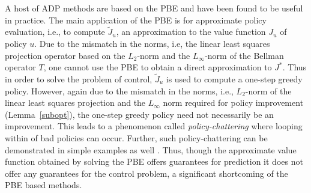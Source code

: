 A host of ADP methods are based on the PBE and have been found to be useful in practice. The main application of the PBE is for approximate policy evaluation, i.e., to compute $\tilde{J}_u$, an approximation to the value function $J_u$ of policy $u$. Due to the mismatch in the norms, i.e, the linear least squares projection operator based on the $L_2$-norm and the $L_\infty$-norm of the Bellman operator $T$, one cannot use the PBE to obtain a direct approximation to $J^*$. Thus in order to solve the problem of control, $\tilde{J}_u$ is used to compute a one-step greedy policy. However, again due to the mismatch in the norms, i.e., $L_2$-norm of the linear least squares projection and the $L_\infty$ norm required for policy improvement (Lemma~\ref{subopt}), the one-step greedy policy need not necessarily be an improvement. This leads to a phenomenon called \emph{policy-chattering} \cite{dpchapter} where looping within of bad policies can occur. Further, such policy-chattering can be demonstrated in simple examples as well \cite{dpchapter}. Thus, though the approximate value function obtained by solving the PBE offers guarantees for prediction it does not offer any guarantees for the control problem, a significant shortcoming of the PBE based methods.\\

